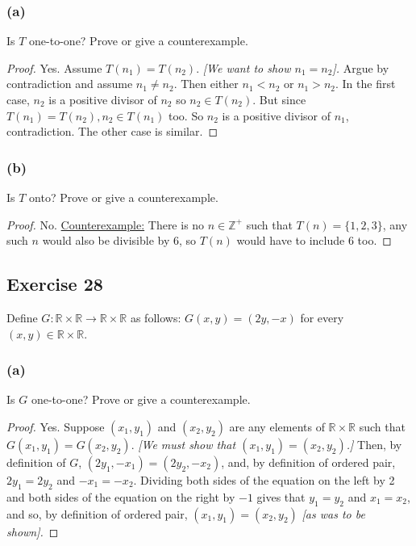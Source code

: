 \documentclass[14pt]{extarticle}
\newcommand{\R}{\mathbb{R}}
\newcommand{\Z}{\mathbb{Z}}
\begin{document}
\subsubsection{(a)}
Is $T$ one-to-one? Prove or give a counterexample.

\begin{proof}
    Yes. Assume \(T(n_1) = T(n_2)\). {\it [We want to show \(n_1 = n_2\)].} Argue by contradiction and assume
    \(n_1 \neq n_2\). Then either \(n_1 < n_2\) or \(n_1 > n_2\). In the first case, $n_2$ is a positive divisor of
    $n_2$ so \(n_2 \in T(n_2)\). But since \(T(n_1) = T(n_2), n_2 \in T(n_1)\) too. So $n_2$ is a positive divisor of
    $n_1$, contradiction. The other case is similar.
\end{proof}

\subsubsection{(b)}
Is $T$ onto? Prove or give a counterexample.

\begin{proof}
    No. \underline{Counterexample:} There is no \(n \in \Z^+\) such that \(T(n) = \{1, 2, 3\}\), any such $n$ would also
    be divisible by 6, so \(T(n)\) would have to include 6 too.
\end{proof}

\subsection{Exercise 28}
Define \(G: \R \times \R \to \R \times \R\) as follows: \(G(x, y) = (2y, -x)\) for every \((x, y) \in \R \times \R\).

\subsubsection{(a)}
Is $G$ one-to-one? Prove or give a counterexample.

\begin{proof}
    Yes. Suppose \((x_1, y_1)\) and \((x_2, y_2)\) are any elements of \(\R \times \R\) such that \(G(x_1, y_1) =
    G(x_ 2, y_2)\). {\it [We must show that \((x_1, y_1) = (x_2, y_2)\).]} Then, by definition of $G$, \((2y_1, -x_1)
    = (2y_2, -x_2)\), and, by definition of ordered pair, \(2y_1 = 2y_2\) and \(-x_1 = -x_2\). Dividing both sides of
    the equation on the left by 2 and both sides of the equation on the right by $-1$ gives that \(y_1 = y_2\) and
    \(x_1 = x_2\), and so, by definition of ordered pair, \((x_1, y_1) = (x_2, y_2)\) {\it [as was to be shown].}
\end{proof}
\end{document}
